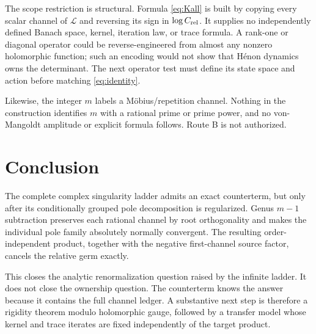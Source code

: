 \documentclass[11pt]{article}
\newcommand{\Crel}{C_{\rm rel}}
\newcommand{\Lm}{\mathcal L}
\begin{document}
The scope restriction is structural.  Formula \eqref{eq:Kall} is built by
copying every scalar channel of $\Lm$ and reversing its sign in
$\log\Crel$.  It supplies no independently defined Banach space, kernel,
iteration law, or trace formula.  A rank-one or diagonal operator could be
reverse-engineered from almost any nonzero holomorphic function; such an
encoding would not show that H\'enon dynamics owns the determinant.  The next
operator test must define its state space and action before matching
\eqref{eq:identity}.

Likewise, the integer $m$ labels a M\"obius/repetition channel.  Nothing in
the construction identifies $m$ with a rational prime or prime power, and no
von-Mangoldt amplitude or explicit formula follows.  Route B is not
authorized.

\section{Conclusion}

The complete complex singularity ladder admits an exact counterterm, but
only after its conditionally grouped pole decomposition is regularized.
Genus $m-1$ subtraction preserves each rational channel by root
orthogonality and makes the individual pole family absolutely normally
convergent.  The resulting order-independent product, together with the
negative first-channel source factor, cancels the relative germ exactly.

This closes the analytic renormalization question raised by the infinite
ladder.  It does not close the ownership question.  The counterterm knows the
answer because it contains the full channel ledger.  A substantive next step
is therefore a rigidity theorem modulo holomorphic gauge, followed by a
transfer model whose kernel and trace iterates are fixed independently of the
target product.



\end{document}
